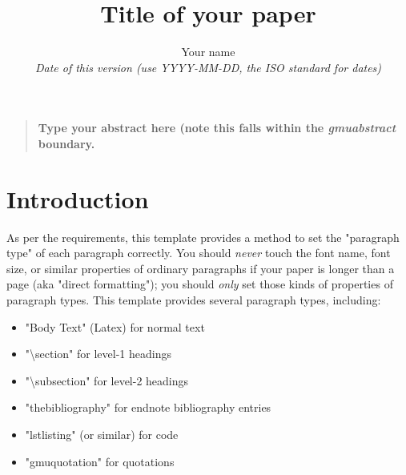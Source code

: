 \documentclass[12pt]{article}
\title{\color{blue} Title of your paper}
\author
{Your name\\
\textit{Date of this version (use YYYY-MM-DD, the ISO standard for dates)}}
\date{}
\newenvironment{gmuabstract}{%
\begin{quote} \bf}
{\end{quote}}
\begin{document}
 



\maketitle 




\begin{gmuabstract}
  Type your abstract here (note this falls within the \textit{gmuabstract} boundary.  \lipsum[1]
\end{gmuabstract}




\section{Introduction}

As per the requirements, this template provides a method to set the "paragraph type" of each paragraph correctly.  You should \textit{never} touch the font name, font size, or similar properties of ordinary paragraphs if your paper is longer than a page (aka "direct formatting"); you should \textit{only} set those kinds of properties of paragraph types.  This template provides several paragraph types, including: 

\begin{itemize}
    \item "Body Text" (Latex) for normal text 
    \item "{\textbackslash}section" for level-1 headings 
    \item "{\textbackslash}subsection" for level-2 headings 
    \item "thebibliography" for endnote bibliography entries 
    \item "lstlisting" (or similar) for code 
    \item "gmuquotation" for quotations 
\end{itemize}
\end{document}

